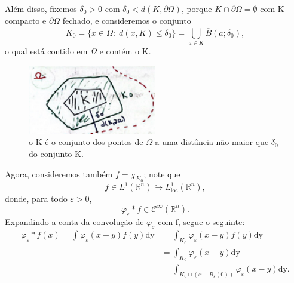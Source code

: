 \documentclass[../distribution_theory_notes.tex]{subfiles}
\begin{document}
\begin{proof*}
      Além disso, fixemos \(\delta_{0}>0\) com \(\delta_{0}< d(K, \partial \Omega )\), porque \(K\cap \partial \Omega =\emptyset \) com K compacto e \(\partial \Omega \) fechado, e consideremos o conjunto 
        \[
          K_{0}=\{x\in \Omega :\; d(x, K)\leq \delta_{0}\} = \bigcup_{a\in K}^{}\overline{B}(a; \delta_{0}),
        \]
        o qual está contido em \(\Omega \) e contém o K.
       \begin{figure}[H]
       \begin{center}
       \includegraphics[height=0.5\textheight, width=0.5\textwidth, keepaspectratio]{./Images/delta_from_k_09.png}
       \end{center}
       \caption{o K é o conjunto dos pontos de \(\Omega \) a uma distância não maior que \(\delta_{0}\) do conjunto K.}
       \end{figure}

       Agora, consideremos também \(f=\chi_{K_{0}}\); note que 
       \[
         f\in L^{1}(\mathbb{R}^{n})\hookrightarrow L_{\mathrm{loc}}^{1}(\mathbb{R}^{n}),
         \]
         donde, para todo \(\varepsilon >0\), 
           \[
             \varphi_{\varepsilon }*f\in \mathcal{C}^{\infty}(\mathbb{R}^{n}).
           \]
           Expandindo a conta da convolução de \(\varphi_\varepsilon \) com f, segue o seguinte: 
          \begin{align*}
            \varphi_\varepsilon *f(x)=\int_{}^{}\varphi_\varepsilon (x-y)f(y) \mathrm{dy}&= \int_{K_{0}}^{}\varphi_\varepsilon (x-y)f(y) \mathrm{dy}\\ 
                                                                                         &= \int_{K_{0}}^{}\varphi_\varepsilon (x-y) \mathrm{dy}\\ 
                                                                                         &= \int_{K_{0}\cap (x-B_\varepsilon (0))}^{}\varphi_\varepsilon (x-y) \mathrm{dy}.
                                                                                     

\end{align*}
\end{proof*}
\end{document}
